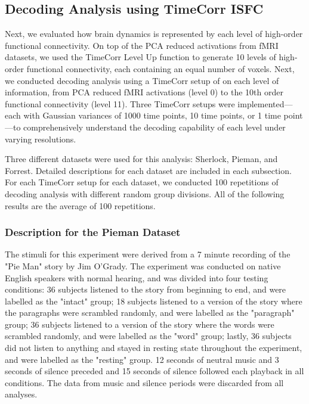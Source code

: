 \documentclass[11pt]{article}
\begin{document}
\subsection{Decoding Analysis using TimeCorr ISFC}
Next, we evaluated how brain dynamics is represented by each level of high-order functional connectivity. On top of the PCA reduced activations from fMRI datasets, we used the TimeCorr Level Up function to generate 10 levels of high-order functional connectivity, each containing an equal number of voxels. Next, we conducted decoding analysis using a TimeCorr setup of on each level of information, from PCA reduced fMRI activations (level 0) to the 10th order functional connectivity (level 11). Three TimeCorr setups were implemented---each with Gaussian variances of 1000 time points, 10 time points, or 1 time point---to comprehensively understand the decoding capability of each level under varying resolutions.

Three different datasets were used for this analysis: Sherlock, Pieman, and Forrest. Detailed descriptions for each dataset are included in each subsection. For each TimeCorr setup for each dataset, we conducted 100 repetitions of decoding analysis with different random group divisions. All of the following results are the average of 100 repetitions.

\subsubsection{Description for the Pieman Dataset}

The stimuli for this experiment were derived from a 7 minute recording of the "Pie Man" story by Jim O'Grady. The experiment was conducted on native English speakers with normal hearing, and was divided into four testing conditions: 36 subjects listened to the story from beginning to end, and were labelled as the "intact" group; 18 subjects listened to a version of the story where the paragraphs were scrambled randomly, and were labelled as the "paragraph" group; 36 subjects listened to a version of the story where the words were scrambled randomly, and were labelled as the "word" group; lastly, 36 subjects did not listen to anything and stayed in resting state throughout the experiment, and were labelled as the "resting" group. 12 seconds of neutral music and 3 seconds of silence preceded and 15 seconds of silence followed each playback in all conditions. The data from music and silence periods were discarded from all analyses.\cite{hasson2016}
\end{document}
